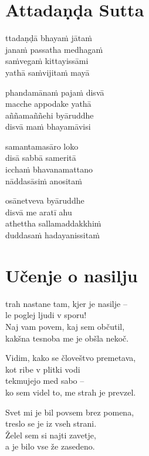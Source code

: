 

\cleartoverso
\chapter*{Attadaṇḍa Sutta}

ttadaṇḍā bhayaṁ jātaṁ\\
janaṁ passatha medhagaṁ\\
saṁvegaṁ kittayissāmi\\
yathā saṁvijitaṁ mayā

phandamānaṁ pajaṁ disvā\\
macche appodake yathā\\
aññamaññehi byāruddhe\\
disvā maṁ bhayamāvisi

samantamasāro loko\\
disā sabbā sameritā\\
icchaṁ bhavanamattano\\
nāddasāsiṁ anositaṁ

osānetveva byāruddhe\\
disvā me aratī ahu\\
athettha sallamaddakkhiṁ\\
duddasaṁ hadayanissitaṁ


\cleartorecto
\chapter{Učenje o nasilju}

trah nastane tam, kjer je nasilje --\\
le poglej ljudi v sporu!\\
Naj vam povem, kaj sem občutil,\\
kakšna tesnoba me je obšla nekoč.

Vidim, kako se človeštvo premetava,\\
kot ribe v plitki vodi\\
tekmujejo med sabo --\\
ko sem videl to, me strah je prevzel.

Svet mi je bil povsem brez pomena,\\
treslo se je iz vseh strani.\\
Želel sem si najti zavetje,\\
a je bilo vse že zasedeno.

